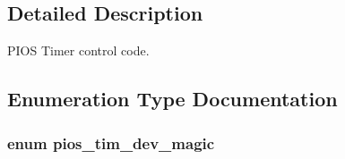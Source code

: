 \subsection{\-Detailed \-Description}
\-P\-I\-O\-S \-Timer control code. 

\subsection{\-Enumeration \-Type \-Documentation}
\hypertarget{group___p_i_o_s___t_i_m_ga7d425167804fd43bc76fe29c11386a6c}{
\subsubsection[{pios\-\_\-tim\-\_\-dev\-\_\-magic}]{\setlength{\rightskip}{0pt plus 5cm}enum {\bf pios\-\_\-tim\-\_\-dev\-\_\-magic}}}\label{group___p_i_o_s___t_i_m_ga7d425167804fd43bc76fe29c11386a6c}
